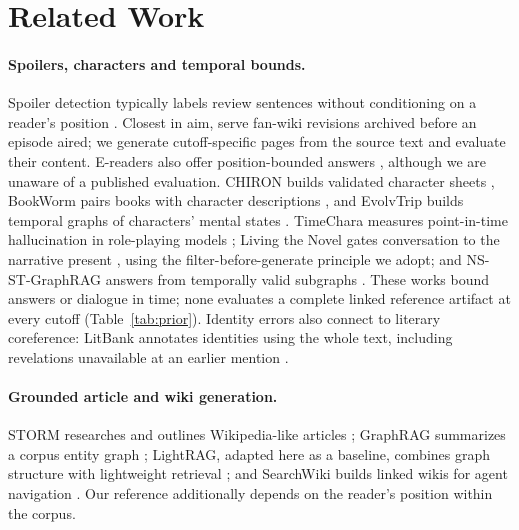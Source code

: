 \section{Related Work}
\label{sec:related}

\paragraph{Spoilers, characters and temporal bounds.}
Spoiler detection typically labels review sentences without conditioning on a reader's
position \citep{wan2019spoiler}. Closest in aim, \citet{jones2018spoilers} serve fan-wiki
revisions archived before an episode aired; we generate cutoff-specific pages from the
source text and evaluate their content. E-readers also offer position-bounded answers
\citep{amazon2025kindle}, although we are unaware of a published evaluation.
CHIRON builds validated character sheets \citep{gurung2024chiron}, BookWorm pairs books with
character descriptions \citep{papoudakis2024bookworm}, and EvolvTrip builds temporal graphs
of characters' mental states \citep{yang2025evolvtrip}. TimeChara measures point-in-time
hallucination in role-playing models \citep{ahn2024timechara}; Living the Novel gates
conversation to the narrative present \citep{huang2025living}, using the
filter-before-generate principle we adopt; and NS-ST-GraphRAG answers from temporally valid
subgraphs \citep{lin2026nsst}. These works bound answers or dialogue in time; none
evaluates a complete linked reference artifact at every cutoff (Table~\ref{tab:prior}).
Identity errors also connect to literary
coreference: LitBank annotates identities using the whole text, including revelations
unavailable at an earlier mention \citep{bamman2020litbank}.

\paragraph{Grounded article and wiki generation.}
STORM researches and outlines Wikipedia-like articles \citep{shao2024storm}; GraphRAG
summarizes a corpus entity graph \citep{edge2024graphrag}; LightRAG, adapted here as a
baseline, combines graph structure with lightweight retrieval \citep{guo2024lightrag}; and
SearchWiki builds linked wikis for agent navigation \citep{singh2026searchwiki}. Our reference
additionally depends on the reader's position within the corpus.

